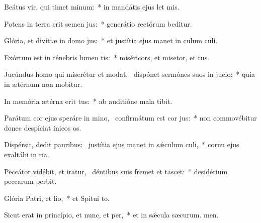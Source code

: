 \item Beátus vir, qui timet minum:~* in mandátis ejus let mis.
\item Potens in terra erit semen jus:~* generátio rectórum beditur.
\item Glória, et divítiæ in domo jus:~* et justítia ejus manet in culum culi.
\item Exórtum est in ténebris lumen tis:~* miséricors, et misetor, et tus.
\item Jucúndus homo qui miserétur et modat,~\pscross{} dispónet sermónes suos in jucio:~* quia in ætérnum non mobitur.
\item In memória ætérna erit tus:~* ab auditióne mala  tibit.
\item Parátum cor ejus speráre in mino,~\pscross{} confirmátum est cor jus:~* non commovébitur donec despíciat inicos os.
\item Dispérsit, dedit pauribus:~\pscross{} justítia ejus manet in sǽculum culi,~* cornu ejus exaltábi in ria.
\item Peccátor vidébit, et iratur,~\pscross{} déntibus suis fremet et tascet:~* desidérium peccarum perbit.
\item Glória Patri, et lio,~* et Spitui to.
\item Sicut erat in princípio, et nunc, et per,~* et in sǽcula sæcurum. men.
